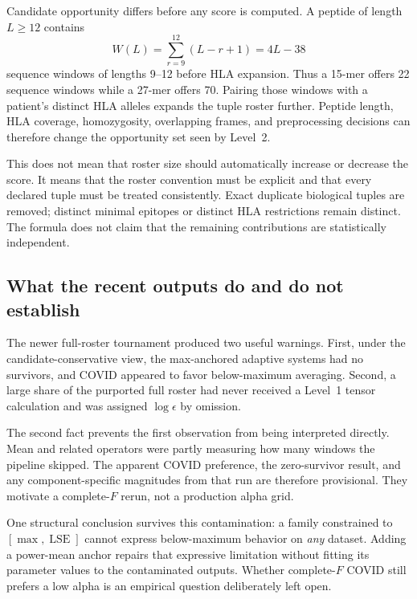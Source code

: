 \documentclass[11pt]{article}
\newcommand{\LSE}{\operatorname{LSE}}
\begin{document}
Candidate opportunity differs before any score is computed. A peptide of
length $L\geq12$ contains
\begin{equation}
W(L)=\sum_{r=9}^{12}(L-r+1)=4L-38
\end{equation}
sequence windows of lengths 9--12 before HLA expansion. Thus a 15-mer offers
22 sequence windows while a 27-mer offers 70. Pairing those windows with a
patient's distinct HLA alleles expands the tuple roster further. Peptide
length, HLA coverage, homozygosity, overlapping frames, and preprocessing
decisions can therefore change the opportunity set seen by Level~2.

This does not mean that roster size should automatically increase or decrease
the score. It means that the roster convention must be explicit and that
every declared tuple must be treated consistently. Exact duplicate biological
tuples are removed; distinct minimal epitopes or distinct HLA restrictions
remain distinct. The formula does not claim that the remaining contributions
are statistically independent.

\subsection{What the recent outputs do and do not establish}

The newer full-roster tournament produced two useful warnings. First, under
the candidate-conservative view, the max-anchored adaptive systems had no
survivors, and COVID appeared to favor below-maximum averaging. Second, a
large share of the purported full roster had never received a Level~1 tensor
calculation and was assigned $\log\epsilon$ by omission.

The second fact prevents the first observation from being interpreted
directly. Mean and related operators were partly measuring how many windows
the pipeline skipped. The apparent COVID preference, the zero-survivor result,
and any component-specific magnitudes from that run are therefore provisional.
They motivate a complete-$F$ rerun, not a production alpha grid.

One structural conclusion survives this contamination: a family constrained
to $[\max,\LSE]$ cannot express below-maximum behavior on \emph{any} dataset.
Adding a power-mean anchor repairs that expressive limitation without fitting
its parameter values to the contaminated outputs. Whether complete-$F$ COVID
still prefers a low alpha is an empirical question deliberately left open.
\end{document}
